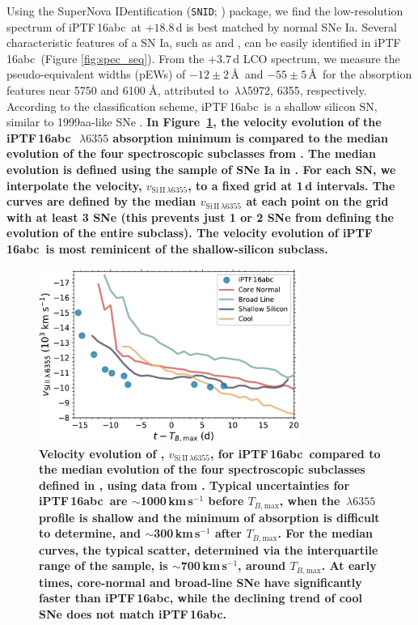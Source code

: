 \documentclass[twocolumn]{aastex61}
\newcommand{\abc}{iPTF\,16abc}
\begin{document}
Using the SuperNova IDentification (\texttt{SNID};
\citealt{2007ApJ...666.1024B}) package, we find the low-resolution spectrum of
\abc\ at $+18.8$\,d is best matched by normal SNe Ia. Several characteristic
features of a SN Ia, such as  and , can be easily
identified in \abc\ (Figure \ref{fig:spec_seq}). From the $+3.7 \, \mathrm{d}$
LCO spectrum, we measure the pseudo-equivalent widths (pEWs) of $-12 \pm
2$\,\AA\ and $-55 \pm 5$\,\AA\ for the absorption features near 5750 and 6100
\AA, attributed to \,$\lambda\lambda$5972, 6355, respectively.
According to the \citet{2006PASP..118..560B} classification scheme, \abc\ is a
shallow silicon SN, similar to 1999aa-like SNe \citep{2009PASP..121..238B}.
\textbf{In Figure~\ref{fig:branch_vel}, the velocity evolution of the \abc\
$\,\lambda6355$ absorption minimum is compared to the median
evolution of the four spectroscopic subclasses from
\citet{2006PASP..118..560B}. The median evolution is defined using the sample
of SNe Ia in \citet{2012AJ....143..126B}. For each SN, we interpolate the
\ion{Si}{2} velocity, $v_{\mathrm{Si\,II}\,\lambda6355}$, to a fixed grid at
1\,d intervals. The curves are defined by the median
$v_{\mathrm{Si\,II}\,\lambda6355}$ at each point on the grid with at least 3
SNe (this prevents just 1 or 2 SNe from defining the evolution of the entire
subclass). The velocity evolution of \abc\ is most reminicent of the
shallow-silicon subclass.}

\begin{figure}[htb]
  \centering
  \includegraphics[width=3.35in]{Branch_vel_evol.pdf}
  \caption{
  \textbf{Velocity evolution of ,
  $v_{\mathrm{Si\,II}\,\lambda6355}$, for \abc\ compared to the median
  evolution of the four spectroscopic subclasses defined in
  \citet{2006PASP..118..560B}, using data from \citet{2012AJ....143..126B}.
  Typical uncertainties for \abc\ are $\sim$1000\,km\,s$^{-1}$ before
  $T_{B,\mathrm{max}}$, when the \ion{Si}{2}$\,\lambda6355$ profile is shallow
  and the minimum of absorption is difficult to determine, and
  $\sim$300\,km\,s$^{-1}$ after $T_{B,\mathrm{max}}$. For the median curves,
  the typical scatter, determined via the interquartile range of the sample,
  is $\sim$700\,km\,s$^{-1}$, around $T_{B,\mathrm{max}}$. At early times,
  core-normal and broad-line SNe have significantly faster \ion{Si}{2} than
  \abc, while the declining trend of cool SNe does not match \abc.} }
  \label{fig:branch_vel}
\end{figure}
\end{document}

